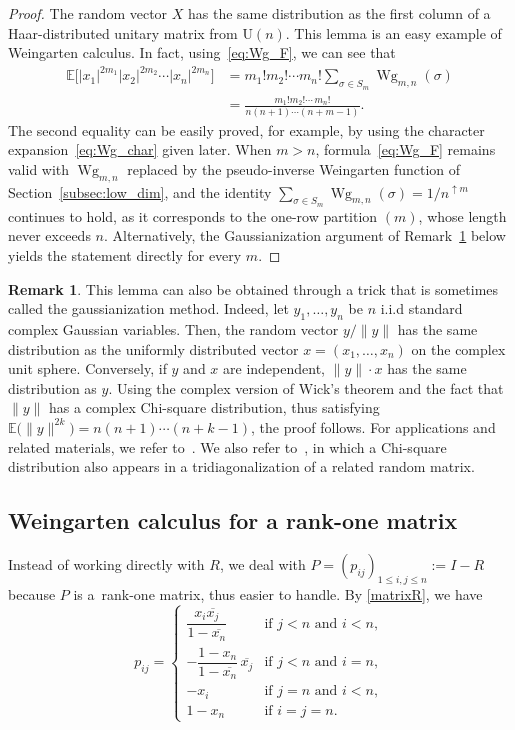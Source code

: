\documentclass[10pt,a4paper]{amsart}
\numberwithin{equation}{section}
\theoremstyle{definition}
\newtheorem{Remark}[Theorem]{Remark}
\newcommand{\UU}{\mathrm{U}}
\DeclareMathOperator{\Wg}{Wg}
\begin{document}
\begin{proof}
The random vector $X$ has the same distribution as
the first column of a Haar-distributed unitary matrix from $\UU(n)$.
This lemma is an easy example of Weingarten calculus.
In fact, using~\eqref{eq:Wg_F}, we can see that
\begin{align*}
\mathbb{E} \bigl[|x_1|^{2m_1} |x_2|^{2m_2} \cdots |x_n|^{2m_n}\bigr]
&=m_1! m_2! \cdots m_n! \sum_{\sigma \in S_m} \Wg_{m,n}(\sigma) \\
&= \frac{m_1! m_2! \cdots \, m_n!}{n(n+1) \cdots (n+m-1)}.
\end{align*}
The second equality can be easily proved, for example, by using the character expansion~\eqref{eq:Wg_char} given later.
When $m > n$, formula~\eqref{eq:Wg_F} remains valid with $\Wg_{m,n}$ replaced by the pseudo-inverse Weingarten function of Section~\ref{subsec:low_dim}, and the identity $\sum_{\sigma \in S_m} \Wg_{m,n}(\sigma) = 1/n^{\uparrow m}$ continues to hold, as it corresponds to the one-row partition $(m)$, whose length never exceeds $n$. Alternatively, the Gaussianization argument of Remark~\ref{rem:gaussianization} below yields the statement directly for every $m$.
\end{proof}

\begin{Remark} \label{rem:gaussianization}
 This lemma can also be obtained through a trick that is sometimes
called the gaussianization method.
Indeed, let
$y_1,\dots, y_n$ be $n$ i.i.d standard complex Gaussian variables. Then, the random vector
$y/\|y\|$ has the same distribution as
the uniformly distributed vector
$x=(x_1,\dots, x_n)$ on the complex unit sphere.
Conversely, if $y$ and $x$ are independent,
$\|y\|\cdot x$ has the same distribution as $y$.
Using the complex version of Wick's theorem and the fact that~$\|y\|$ has a complex Chi-square distribution, thus satisfying
$\mathbb{E}\bigl(\|y \|^{2k}\bigr)=n(n+1)\cdots (n+k-1)$,
the proof follows.
For applications and related materials, we refer to~\cite[Theorem 6.1]{BanicaCollins2008}.
We also refer to~\cite{MR1936554}, in which a Chi-square distribution also appears in a tridiagonalization of a related random matrix.
\end{Remark}

\subsection{Weingarten calculus for a rank-one matrix}

Instead of working directly with $R$,
we deal with $P =(p_{ij})_{1 \le i,j \le n}:=I-R$ because $P$ is a~rank-one matrix, thus easier to handle.
By \eqref{matrixR}, we have
\begin{equation} \label{matrixP}
p_{ij}= \begin{cases}
\dfrac{x_{i}\overline{x_{j}}}{1-\overline{x_{n}}} &\text{if $j<n$ and $i <n$}, \\
-\dfrac{1-x_{n}}{1-\overline{x_{n}}}\, \overline{x_{j}} &\text{if $j<n$ and $i=n$},\\
-x_i & \text{if $j=n$ and $i < n$}, \\
1-x_n & \text{if $i=j=n$}.
\end{cases}
\end{equation}
\end{document}
